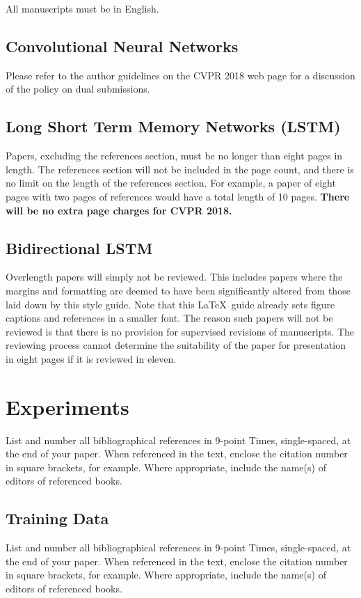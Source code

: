 \documentclass[10pt,twocolumn,letterpaper]{article}
\begin{document}
All manuscripts must be in English.

\subsection{Convolutional Neural Networks}

Please refer to the author guidelines on the CVPR 2018 web page for a
discussion of the policy on dual submissions.

\subsection{Long Short Term Memory Networks (LSTM)}
Papers, excluding the references section,
must be no longer than eight pages in length. The references section
will not be included in the page count, and there is no limit on the
length of the references section. For example, a paper of eight pages
with two pages of references would have a total length of 10 pages.
{\bf There will be no extra page charges for CVPR 2018.}

\subsection{Bidirectional LSTM}
Overlength papers will simply not be reviewed.  This includes papers
where the margins and formatting are deemed to have been significantly
altered from those laid down by this style guide.  Note that this
\LaTeX\ guide already sets figure captions and references in a smaller font.
The reason such papers will not be reviewed is that there is no provision for
supervised revisions of manuscripts.  The reviewing process cannot determine
the suitability of the paper for presentation in eight pages if it is
reviewed in eleven.  


\section{Experiments}

List and number all bibliographical references in 9-point Times,
single-spaced, at the end of your paper. When referenced in the text,
enclose the citation number in square brackets, for
example.  Where appropriate, include the name(s) of
editors of referenced books.

\subsection{Training Data}
List and number all bibliographical references in 9-point Times,
single-spaced, at the end of your paper. When referenced in the text,
enclose the citation number in square brackets, for
example.  Where appropriate, include the name(s) of
editors of referenced books.
\end{document}
